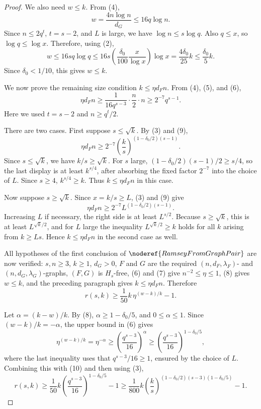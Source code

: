 \begin{proof}
We also need \(w\le k\). From (4),
\[
  w=\frac{4n\log n}{d_G}\le 16q\log n.
\]
Since \(n\le2q^t\), \(t=s-2\), and \(L\) is large, we have \(\log n\le s\log q\). Also \(q\le x\), so \(\log q\le\log x\). Therefore, using (2),
\[
  w\le16s q\log q
    \le16s\left(\frac{\delta_0}{100}\frac{x}{\log x}\right)\log x
    =\frac{4\delta_0}{25}k
    \le \frac{\delta_0}{5}k. \tag{8}
\]
Since \(\delta_0<1/10\), this gives \(w\le k\).

We now prove the remaining size condition \(k\le \eta d_F n\). From (4), (5), and (6),
\[
  \eta d_F n
  \ge \frac{1}{16q^{s-3}}\cdot\frac n2\cdot n
  \ge 2^{-7}q^{s-1}. \tag{9}
\]
Here we used \(t=s-2\) and \(n\ge q^t/2\).

There are two cases. First suppose \(s\le\sqrt{k}\). By (3) and (9),
\[
  \eta d_F n
  \ge 2^{-7}\left(\frac{k}{s}\right)^{(1-\delta_0/2)(s-1)}.
\]
Since \(s\le\sqrt{k}\), we have \(k/s\ge\sqrt{k}\). For \(s\) large, \((1-\delta_0/2)(s-1)/2\ge s/4\), so the last display is at least \(k^{s/4}\), after absorbing the fixed factor \(2^{-7}\) into the choice of \(L\). Since \(s\ge4\), \(k^{s/4}\ge k\). Thus \(k\le\eta d_F n\) in this case.

Now suppose \(s\ge\sqrt{k}\). Since \(x=k/s\ge L\), (3) and (9) give
\[
  \eta d_F n\ge 2^{-7}L^{(1-\delta_0/2)(s-1)}.
\]
Increasing \(L\) if necessary, the right side is at least \(L^{s/2}\). Because \(s\ge\sqrt{k}\), this is at least \(L^{\sqrt{k}/2}\), and for \(L\) large the inequality \(L^{\sqrt{k}/2}\ge k\) holds for all \(k\) arising from \(k\ge Ls\). Hence \(k\le\eta d_F n\) in the second case as well.

All hypotheses of the first conclusion of \(\noderef{RamseyFromGraphPair}\) are now verified: \(s,n\ge3\), \(k\ge1\), \(d_G>0\), \(F\) and \(G\) are the required \((n,d_F,\lambda_F)\)- and \((n,d_G,\lambda_G)\)-graphs, \((F,G)\) is \(H_s\)-free, (6) and (7) give \(n^{-2}\le\eta\le1\), (8) gives \(w\le k\), and the preceding paragraph gives \(k\le\eta d_F n\). Therefore
\[
  r(s,k)\ge \frac{1}{50}k\,\eta^{(w-k)/k}-1. \tag{10}
\]

Let \(\alpha=(k-w)/k\). By (8), \(\alpha\ge1-\delta_0/5\), and \(0\le\alpha\le1\). Since \((w-k)/k=-\alpha\), the upper bound in (6) gives
\[
  \eta^{(w-k)/k}
  =\eta^{-\alpha}
  \ge \left(\frac{q^{s-3}}{16}\right)^\alpha
  \ge \left(\frac{q^{s-3}}{16}\right)^{1-\delta_0/5},
\]
where the last inequality uses that \(q^{s-3}/16\ge1\), ensured by the choice of \(L\). Combining this with (10) and then using (3),
\[
  r(s,k)
  \ge \frac{1}{50}k
      \left(\frac{q^{s-3}}{16}\right)^{1-\delta_0/5}-1
  \ge \frac{1}{800}k
      \left(\frac{k}{s}\right)^{(1-\delta_0/2)(s-3)(1-\delta_0/5)}
      -1. \tag{11}
\]


\end{proof}
